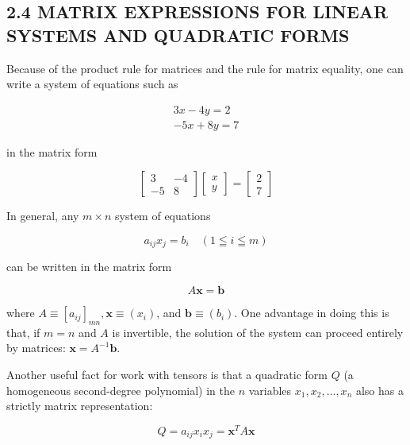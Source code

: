 \documentclass[10pt]{article}
\begin{document}
\subsection*{2.4 MATRIX EXPRESSIONS FOR LINEAR SYSTEMS AND QUADRATIC FORMS}
Because of the product rule for matrices and the rule for matrix equality, one can write a system of equations such as

$$
\begin{array}{r}
3 x-4 y=2 \\
-5 x+8 y=7
\end{array}
$$

in the matrix form

$$
\left[\begin{array}{rr}
3 & -4 \\
-5 & 8
\end{array}\right]\left[\begin{array}{l}
x \\
y
\end{array}\right]=\left[\begin{array}{l}
2 \\
7
\end{array}\right]
$$

In general, any $m \times n$ system of equations


\begin{equation*}
a_{i j} x_{j}=b_{i} \quad(1 \leqq i \leqq m) \tag{2.12a}
\end{equation*}


can be written in the matrix form


\begin{equation*}
A \mathbf{x}=\mathbf{b} \tag{2.12b}
\end{equation*}


where $A \equiv\left[a_{i j}\right]_{m n}, \mathbf{x} \equiv\left(x_{i}\right)$, and $\mathbf{b} \equiv\left(b_{i}\right)$. One advantage in doing this is that, if $m=n$ and $A$ is invertible, the solution of the system can proceed entirely by matrices: $\mathbf{x}=A^{-1} \mathbf{b}$.

Another useful fact for work with tensors is that a quadratic form $Q$ (a homogeneous second-degree polynomial) in the $n$ variables $x_{1}, x_{2}, \ldots, x_{n}$ also has a strictly matrix representation:


\begin{equation*}
Q=a_{i j} x_{i} x_{j}=\mathbf{x}^{T} A \mathbf{x} \tag{2.13}
\end{equation*}
\end{document}
